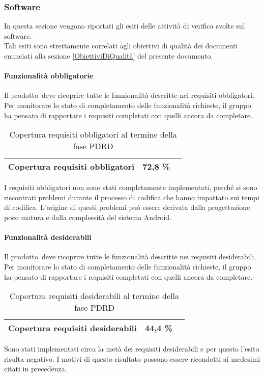 \documentclass[../PianoDiQualifica.tex]{subfiles}
\begin{document}
\begin{appendices}
			
		\subsubsection{Software}
		In questa sezione vengono riportati gli esiti delle attività di verifica svolte sul software.\\
		Tali esiti sono strettamente correlati agli obiettivi di qualità dei documenti enunciati alla sezione \ref{ObiettiviDiQualità} del presente documento.
		
			\paragraph{Funzionalità obbligatorie}
				Il prodotto\g\ deve ricoprire tutte le funzionalità descritte nei requisiti obbligatori. Per monitorare lo stato di completamento delle funzionalità richieste, il gruppo ha pensato di rapportare i requisiti completati con quelli ancora da completare.
				\begin{table}[H]
				\centering
				\begin{tabular}{l * {2}{c}}
					\midrule
					Copertura requisiti obbligatori & 72,8 \% \\
					\midrule
				\end{tabular}
				\caption{Copertura requisiti obbligatori al termine della fase PDRD}
				\label{tab:copertura_requisiti_obbligatori}
			\end{table}
			I requisiti obbligatori non sono stati completamente implementati, perché si sono riscontrati problemi durante il processo di codifica che hanno impattato sui tempi di codifica. L'origine di questi problemi può essere derivata dalla progettazione poco matura e dalla complessità del sistema Android\g.  
			
			\paragraph{Funzionalità desiderabili}
				Il prodotto\g\ deve ricoprire tutte le funzionalità descritte nei requisiti desiderabili. Per monitorare lo stato di completamento delle funzionalità richieste, il gruppo ha pensato di rapportare i requisiti completati con quelli ancora da completare.
			\begin{table}[H]
				\centering
				\begin{tabular}{l * {2}{c}}
					\midrule
					Copertura requisiti desiderabili & 44,4 \% \\
					\midrule
				\end{tabular}
				\caption{Copertura requisiti desiderabili al termine della fase PDRD}
				\label{tab:copertura_requisiti_desiderabili}
			\end{table}
			Sono stati implementati circa la metà dei requisiti desiderabili e per questo l'esito risulta negativo. I motivi di questo risultato possono essere ricondotti ai medesimi citati in precedenza.
			

\end{appendices}
\end{document}
